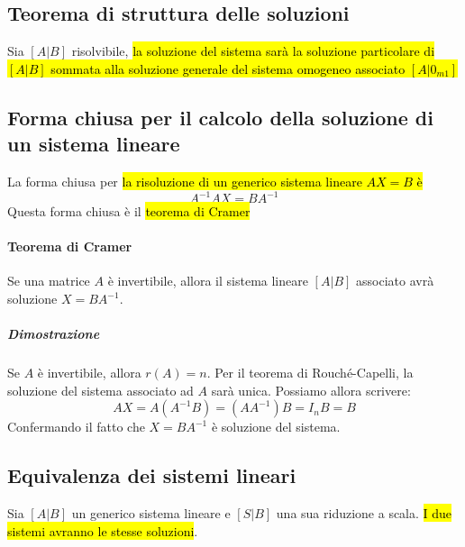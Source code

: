 \documentclass[a4paper,12pt,oneside]{article}
\begin{document}
\subsection{Teorema di struttura delle soluzioni}
Sia $[A|B]$ risolvibile, \hl{la soluzione del sistema sarà la soluzione particolare di
$[A|B]$ sommata alla soluzione generale del sistema omogeneo associato $[A|0_{m1}]$}

\subsection{Forma chiusa per il calcolo della soluzione di un sistema lineare}
La forma chiusa per \hl{la risoluzione di un generico sistema lineare $AX = B$ è}
\[
    A^{-1}AX = BA^{-1}
\]
Questa forma chiusa è il \hl{teorema di Cramer}

\paragraph{Teorema di Cramer} Se una matrice $A$ è invertibile, allora il
sistema lineare $[A|B]$ associato avrà soluzione $X = BA^{-1}$.

\subparagraph{Dimostrazione} Se $A$ è invertibile, allora $r(A) = n$. Per il
teorema di Rouché-Capelli, la soluzione del sistema associato ad $A$ sarà unica.
Possiamo allora scrivere:
\[
    AX = A(A^{-1}B) = (AA^{-1})B = I_n B = B
\]
Confermando il fatto che $X = BA^{-1}$ è soluzione del sistema.

\subsection{Equivalenza dei sistemi lineari}
Sia $[A|B]$ un generico sistema lineare e $[S|B]$ una sua riduzione a scala.
\hl{I due sistemi avranno le stesse soluzioni}.
\end{document}
